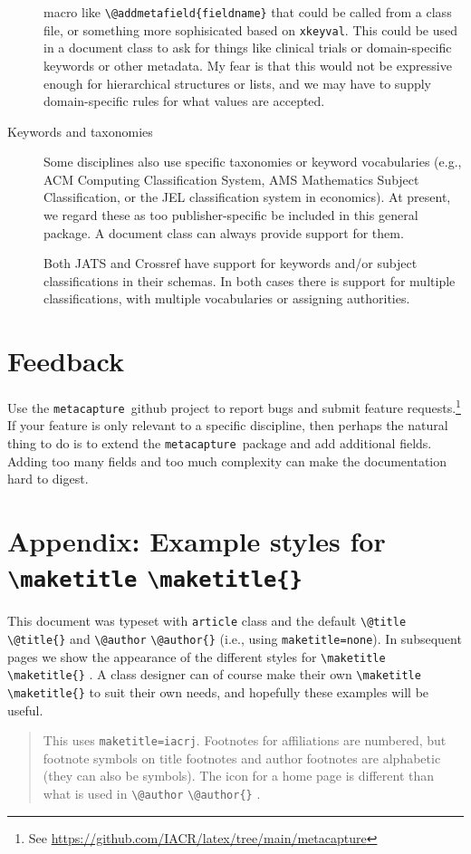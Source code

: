 \documentclass{article}
\newcommand{\pkgname}{\texttt{metacapture}}
\newcommand{\cmd}[2][]{%
  \def\FirstArg{#1}%
  \ifx\FirstArg\empty%
    \texttt{\textbackslash{}#2}%
  \else%
    \texttt{\textbackslash{}#2\{#1\}}%
  \fi
}
\newcommand{\todok}[1]{\todo[inline,color=green!20]{K: #1}}
\begin{document}
\begin{description}
{macro like \texttt{\textbackslash{@addmetafield}\{fieldname\}} that
could be called from a class file, or something more sophisicated
based on \texttt{xkeyval}. This could be used in a document class to
ask for things like clinical trials or domain-specific keywords or
other metadata.  My fear is that
this would not be expressive enough for hierarchical structures or
lists, and we may have to supply domain-specific rules for what values
are accepted.}
\item[Keywords and taxonomies]
Some disciplines also use specific taxonomies or keyword vocabularies (e.g.,
ACM Computing Classification System, AMS Mathematics Subject
Classification, or the JEL classification system in economics).  At
present, we regard these as too publisher-specific be included in this
general package. A document class can always provide support for them.


Both JATS and Crossref have support for keywords and/or subject classifications in
their schemas. In both cases there is support for multiple classifications, with multiple
vocabularies or assigning authorities.
\end{description}
\section{Feedback}
Use the \pkgname\ github project to report bugs and submit feature
requests.\footnote{See \url{https://github.com/IACR/latex/tree/main/metacapture}}
If
your feature is only relevant to a specific discipline, then perhaps
the natural thing to do is to extend the \pkgname\ package and add
additional fields. Adding too many fields and too much complexity can
make the documentation hard to digest.

\todok{Should we upload to CTAN?}


\appendix
\section{Appendix: Example styles for \cmd{maketitle}\label{appendix}}
This document was typeset with \texttt{article} class and the
default \cmd{@title} and \cmd{@author} (i.e.,
using \texttt{maketitle=none}).  In subsequent pages we show the
appearance of the different styles for \cmd{maketitle}. A class designer can of
course make their own \cmd{maketitle} to suit their own needs, and hopefully these
examples will be useful.
\makeatletter

\newpage
{}
\setcounter{footnote}{0}
\METAC@iacrj@maketitle
\begin{quote}
This uses \texttt{maketitle=iacrj}. Footnotes for affiliations are numbered, but footnote symbols on
title footnotes and author footnotes are alphabetic (they can also be symbols). The icon for a home page
is different than what is used in \cmd{@author}.
\end{quote}
\label{iacrj}
\end{document}

